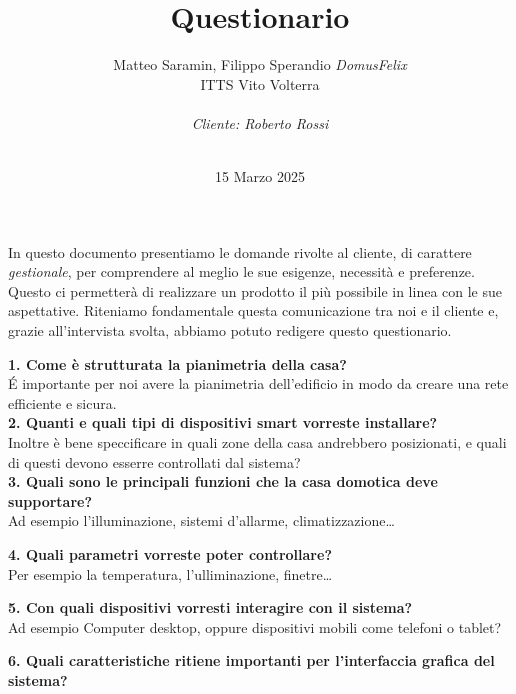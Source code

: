 \documentclass{exam}
\title{Questionario}
\author{Matteo Saramin, Filippo Sperandio \textit{DomusFelix} \\ {\small ITTS Vito Volterra} \\ \\ \emph{Cliente: Roberto Rossi}}
\date{\version\\ 15 Marzo 2025}
\begin{document}
\maketitle
\vspace{5mm}
In questo documento presentiamo le domande rivolte al cliente, di carattere \emph{gestionale},
per comprendere al meglio le sue esigenze, necessità e preferenze. 
Questo ci permetterà di realizzare un prodotto il più possibile in linea con le sue aspettative. 
Riteniamo fondamentale questa comunicazione tra noi e il cliente e, grazie all'intervista svolta, abbiamo potuto redigere questo questionario.

\clearpage
\noindent\textbf{1. Come è strutturata la pianimetria della casa?}\\[1.5mm]
É importante per noi avere la pianimetria dell'edificio in modo da creare una rete efficiente e sicura.\\

\vspace{15mm}
\noindent\textbf{2. Quanti e quali tipi di dispositivi smart vorreste installare?}\\[1.5mm]
Inoltre è bene speccificare in quali zone della casa andrebbero posizionati, e quali di questi devono esserre controllati dal sistema?\\

\vspace{15mm}
\noindent\textbf{3. Quali sono le principali funzioni che la casa domotica deve supportare?}\\[1.5mm]
Ad esempio l'illuminazione, sistemi d'allarme, climatizzazione\ldots

\vspace{15mm}
\noindent\textbf{4. Quali parametri vorreste poter controllare?}\\[1.5mm]
Per esempio la temperatura, l'ulliminazione, finetre\ldots

\vspace{15mm}
\noindent\textbf{5. Con quali dispositivi vorresti interagire con il sistema?}\\[1.5mm]
Ad esempio Computer desktop, oppure dispositivi mobili come telefoni o tablet?

\vspace{15mm}
\noindent\textbf{6. Quali caratteristiche ritiene importanti per l’interfaccia grafica del sistema?}\\[1.5mm]
\end{document}
